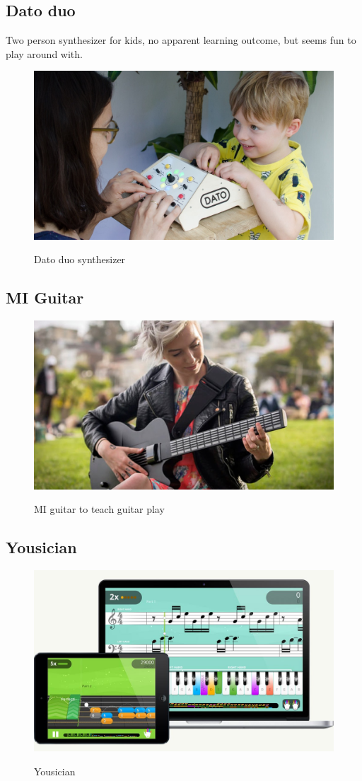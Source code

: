 	\subsection{Dato duo}
		Two person synthesizer for kids, no apparent learning outcome, but seems fun to play around with.
		\begin{figure}[H]
			\centering
			\includegraphics[width=0.7\linewidth]{figure/Analysis/datoduo}
			\label{fig:datoduo}
			\caption{Dato duo synthesizer}
		\end{figure}
	\subsection{MI Guitar}
		\begin{figure}[H]
			\centering
			\includegraphics[width=0.8\linewidth]{figure/Analysis/miguitar}
			\label{fig:miguitar}
			\caption{MI guitar to teach guitar play}
		\end{figure}
	
	\subsection{Yousician}
		\begin{figure}[H]
			\centering
			\includegraphics[width=0.8\linewidth]{figure/Analysis/yousician.jpg}
			\label{fig:yousician}
			\caption{Yousician}
		\end{figure}
